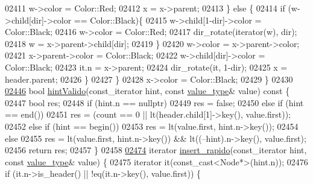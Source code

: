 \begin{DoxyCode}
02411                 w->color = Color::Red;
02412                 x = x->parent;
02413             \} \textcolor{keywordflow}{else} \{
02414                 \textcolor{keywordflow}{if} (w->child[dir]->color == Color::Black)\{
02415                     w->child[1-dir]->color = Color::Black;
02416                     w->color = Color::Red;
02417                     dir\_rotate(iterator(w), dir);
02418                     w = x->parent->child[dir];
02419                 \}
02420                 w->color = x->parent->color;
02421                 x->parent->color = Color::Black;
02422                 w->child[dir]->color = Color::Black;
02423                 it.n = x->parent;
02424                 dir\_rotate(it, 1-dir);
02425                 x = header.parent;
02426             \}
02427         \}
02428         x->color = Color::Black;
02429     \}
02430 
\hyperlink{classaed2_1_1map_a0039f50bdf2b4e5836a1ad437ecb2202_a0039f50bdf2b4e5836a1ad437ecb2202}{02446}     \textcolor{keywordtype}{bool} \hyperlink{classaed2_1_1map_a0039f50bdf2b4e5836a1ad437ecb2202_a0039f50bdf2b4e5836a1ad437ecb2202}{hintValido}(const\_iterator hint, \textcolor{keyword}{const} \hyperlink{classaed2_1_1map_a719db98e0ff9a837610f76be33264680_a719db98e0ff9a837610f76be33264680}{value\_type}& value)\textcolor{keyword}{ const }\{
02447         \textcolor{keywordtype}{bool} res;
02448         \textcolor{keywordflow}{if} (hint.n == \textcolor{keyword}{nullptr})
02449             res = \textcolor{keyword}{false};
02450         \textcolor{keywordflow}{else} \textcolor{keywordflow}{if} (hint == end())
02451             res = (count == 0 || lt(header.child[1]->key(), value.first));
02452         \textcolor{keywordflow}{else} \textcolor{keywordflow}{if} (hint == begin())
02453             res = lt(value.first, hint.n->key());
02454         \textcolor{keywordflow}{else}
02455             res = lt(value.first, hint.n->key()) && lt((--hint).n->key(), value.first);
02456         \textcolor{keywordflow}{return} res;
02457     \}
02458 
\hyperlink{classaed2_1_1map_a4b4f1e65ee9aeccee4046d53fd5fd8a4_a4b4f1e65ee9aeccee4046d53fd5fd8a4}{02474}     iterator \hyperlink{classaed2_1_1map_a4b4f1e65ee9aeccee4046d53fd5fd8a4_a4b4f1e65ee9aeccee4046d53fd5fd8a4}{insert\_rapido}(const\_iterator hint, \textcolor{keyword}{const} \hyperlink{classaed2_1_1map_a719db98e0ff9a837610f76be33264680_a719db98e0ff9a837610f76be33264680}{value\_type}& value) \{
02475         iterator it(const\_cast<Node*>(hint.n));
02476         \textcolor{keywordflow}{if} (it.n->is\_header() || !eq(it.n->key(), value.first)) \{

\end{DoxyCode}
